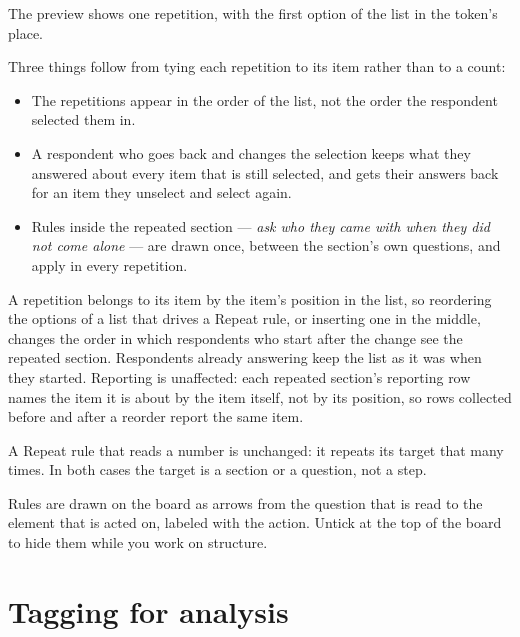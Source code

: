 \documentclass[11pt, a4paper]{article}
\begin{document}
\begin{quote}
\end{quote}

The preview shows one repetition, with the first option of the list in the token's place.

Three things follow from tying each repetition to its item rather than to a count:

\begin{itemize}
  \item The repetitions appear in the order of the list, not the order the respondent selected
        them in.
  \item A respondent who goes back and changes the selection keeps what they answered about
        every item that is still selected, and gets their answers back for an item they
        unselect and select again.
  \item Rules inside the repeated section — \emph{ask who they came with when they did not come
        alone} — are drawn once, between the section's own questions, and apply in every
        repetition.
\end{itemize}

\begin{elicitnote}
A repetition belongs to its item by the item's position in the list, so reordering the options
of a list that drives a Repeat rule, or inserting one in the middle, changes the order in which
respondents who start after the change see the repeated section. Respondents already answering
keep the list as it was when they started. Reporting is unaffected: each repeated section's
reporting row names the item it is about by the item itself, not by its position, so rows
collected before and after a reorder report the same item.
\end{elicitnote}

A Repeat rule that reads a number is unchanged: it repeats its target that many times. In both
cases the target is a section or a question, not a step.

Rules are drawn on the board as arrows from the question that is read to the element that is
acted on, labeled with the action. Untick  at the top of the board to hide them
while you work on structure.

\section{Tagging for analysis}
\label{sec:analysis}
\end{document}
